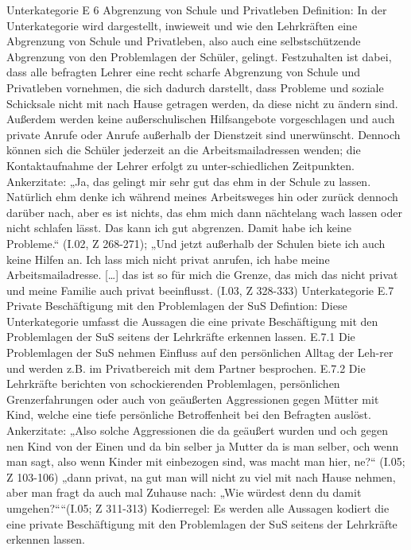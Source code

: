 Unterkategorie E 6 Abgrenzung von Schule und Privatleben
Definition: In der Unterkategorie wird dargestellt, inwieweit und wie den Lehrkräften eine Abgrenzung von Schule und Privatleben, also auch eine selbstschützende Abgrenzung von den Problemlagen der Schüler, gelingt. Festzuhalten ist dabei, dass alle befragten Lehrer eine recht scharfe Abgrenzung von Schule und Privatleben vornehmen, die sich dadurch darstellt, dass Probleme und soziale Schicksale nicht mit nach Hause getragen werden, da diese nicht zu ändern sind. Außerdem werden keine außerschulischen Hilfsangebote vorgeschlagen und auch private Anrufe oder Anrufe außerhalb der Dienstzeit sind unerwünscht. Dennoch können sich die Schüler jederzeit an die Arbeitsmailadressen wenden; die Kontaktaufnahme der Lehrer erfolgt zu unter-schiedlichen Zeitpunkten. 
Ankerzitate: „Ja, das gelingt mir sehr gut das ehm in der Schule zu lassen. Natürlich ehm denke ich während meines Arbeitsweges hin oder zurück dennoch darüber nach, aber es ist nichts, das ehm mich dann nächtelang wach lassen oder nicht schlafen lässt. Das kann ich gut abgrenzen. Damit habe ich keine Probleme.“ (I.02, Z 268-271); „Und jetzt außerhalb der Schulen biete ich auch keine Hilfen an. Ich lass mich nicht privat anrufen, ich habe meine Arbeitsmailadresse. […] das ist so für mich die Grenze, das mich das nicht privat und meine Familie auch privat beeinflusst. (I.03, Z 328-333)
Unterkategorie E.7 Private Beschäftigung mit den Problemlagen der SuS
Defintion: Diese Unterkategorie umfasst die Aussagen die eine private Beschäftigung mit den Problemlagen der SuS seitens der Lehrkräfte erkennen lassen. 
E.7.1 Die Problemlagen der SuS nehmen Einfluss auf den persönlichen Alltag der Leh-rer und werden z.B. im Privatbereich mit dem Partner besprochen.
E.7.2 Die Lehrkräfte berichten von schockierenden Problemlagen, persönlichen Grenzerfahrungen oder auch von geäußerten Aggressionen gegen Mütter mit Kind, welche eine tiefe persönliche Betroffenheit bei  den Befragten auslöst.
Ankerzitate: „Also solche Aggressionen die da geäußert wurden und och gegen nen Kind von der Einen und da bin selber ja Mutter da is man selber, och wenn  man sagt, also wenn Kinder mit einbezogen sind, was macht man hier, ne?“ (I.05; Z 103-106)
„dann privat, na gut man will nicht zu viel mit nach Hause nehmen, aber man fragt da auch mal Zuhause nach: „Wie würdest denn du damit umgehen?““(I.05; Z 311-313)
Kodierregel: Es werden alle Aussagen kodiert die eine private Beschäftigung mit den Problemlagen der SuS seitens der Lehrkräfte erkennen lassen.


